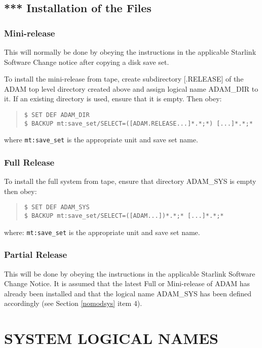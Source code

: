 \subsection{*** Installation of the Files}
\subsubsection{Mini-release}
This will normally be done by obeying the instructions in the applicable
Starlink Software Change notice after copying a disk save set.

To install the mini-release from tape, create subdirectory [.RELEASE]
of the ADAM top level directory created above and assign logical name ADAM\_DIR
to it. If an existing directory is used, ensure that it is empty. Then obey:
\small \begin{quote}
\begin{verbatim}
$ SET DEF ADAM_DIR
$ BACKUP mt:save_set/SELECT=([ADAM.RELEASE...]*.*;*) [...]*.*;*
\end{verbatim}
\end{quote} \normalsize
where \verb+mt:save_set+ is the appropriate unit and save set name.

\subsubsection{Full Release}
To install the full system from tape, ensure that directory ADAM\_SYS is empty
then obey:
\small \begin{quote}
\begin{verbatim}
$ SET DEF ADAM_SYS
$ BACKUP mt:save_set/SELECT=([ADAM...])*.*;* [...]*.*;*
\end{verbatim}
\end{quote} \normalsize
where: \verb+mt:save_set+ is the appropriate unit and save set name.

\subsubsection{Partial Release}
This will be done by obeying the instructions in the applicable Starlink
Software Change Notice.
It is assumed that the latest Full or Mini-release of ADAM has already been
installed and that the logical name ADAM\_SYS has been defined accordingly
(see Section \ref{nomodsys} item 4).

\section{SYSTEM LOGICAL NAMES}
